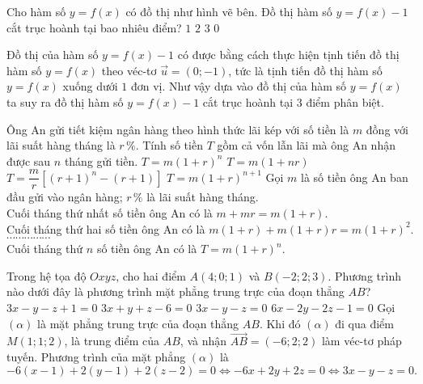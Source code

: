 \begin{ex}%
 \immini
 {
 Cho hàm số $y=f(x)$ có đồ thị như hình vẽ bên. Đồ thị hàm số $y=f(x)-1$ cắt trục hoành tại bao nhiêu điểm?
 \choice
  {$1$}
  {$2$}
  {\True $3$}
  {$0$}
 }
 {
 }
 \loigiai
  {
  Đồ thị của hàm số $y=f(x)-1$ có được bằng cách thực hiện tịnh tiến đồ thị hàm số $y=f(x)$ theo véc-tơ $\vec{u}=(0;-1)$, tức là tịnh tiến đồ thị hàm số $y=f(x)$ xuống dưới $1$ đơn vị. Như vậy dựa vào đồ thị của hàm số $y = f(x)$ ta suy ra đồ thị hàm số $y=f(x)-1$ cắt trục hoành tại $3$ điểm phân biệt.
  }
\end{ex}


\begin{ex}%
 Ông An gửi tiết kiệm ngân hàng theo hình thức lãi kép với số tiền là $m$ đồng với lãi suất hàng tháng là $r \, \%$. Tính số tiền $T$ gồm cả vốn lẫn lãi mà ông An nhận được sau $n$ tháng gửi tiền.
 \choice
  {\True $T=m(1+r)^n$}
  {$T=m(1+nr)$}
  {$T=\dfrac{m}{r}\left[(r+1)^n - (r+1)\right]$}
  {$T=m(1+r)^{n+1}$}
 \loigiai
  {
  Gọi $m$ là số tiền ông An ban đầu gửi vào ngân hàng; $r\,\%$ là lãi suất hàng tháng.\\
  Cuối tháng thứ nhất số tiền ông An có là $m + mr = m(1+r)$.\\
  Cuối tháng thứ hai số tiền ông An có là $m(1+r)+m(1+r)r = m(1+r)^2$.\\
  $\cdots\cdots\cdots\cdots\cdots$\\
  Cuối tháng thứ $n$ số tiền ông An có là $T = m(1+r)^n$.
  }
\end{ex}


\begin{ex}%
 Trong hệ tọa độ $Oxyz$, cho hai điểm $A(4;0;1)$ và $B(-2;2;3)$. Phương trình nào dưới đây là phương trình mặt phẳng trung trực của đoạn thẳng $AB$?
 \choice
  {$3x-y-z+1=0$}
  {$3x+y+z-6=0$}
  {\True $3x-y-z=0$}
  {$6x-2y-2z-1=0$}
 \loigiai
  {
  Gọi $(\alpha)$ là mặt phẳng trung trực của đoạn thẳng $AB$. Khi đó $(\alpha)$ đi qua điểm $M(1;1;2)$, là trung điểm của $AB$, và nhận $\overrightarrow{AB}=(-6;2;2)$ làm véc-tơ pháp tuyến. Phương trình của mặt phẳng $(\alpha)$ là
  $$-6(x-1)+2(y-1)+2(z-2)=0 \Leftrightarrow -6x+2y+2z=0 \Leftrightarrow 3x-y-z=0.$$
  }
\end{ex}


